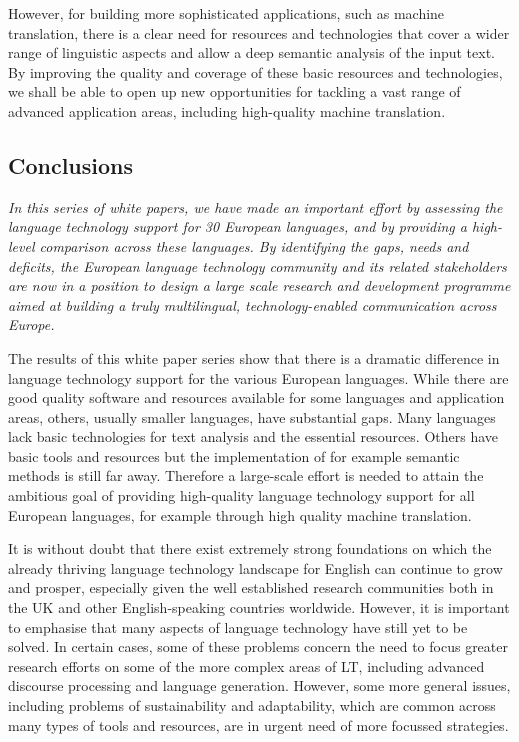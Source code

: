 \documentclass[]{../../metanetpaper}
\begin{document}
\begin{multicols}{2}
However, for building more sophisticated applications, such as machine translation, there is a clear need for resources and technologies that cover a wider range of linguistic aspects and allow a deep semantic analysis of the input text. By improving the quality and coverage of these basic resources and technologies, we shall be able to open up new opportunities for tackling a vast range of advanced application areas, including high-quality machine translation.

\subsection{Conclusions}

\emph{In this series of white papers, we have made an important effort by assessing the language technology support for 30 European languages, and by providing a high-level comparison across these languages. By identifying the gaps, needs and deficits, the European language technology community and its related stakeholders are now in a position to design a large scale research and development programme aimed at building a truly multilingual, technology-enabled communication across Europe.}

The results of this white paper series show that there is a dramatic difference in language technology support for the various European languages. While there are good quality software and resources available for some languages and application areas, others, usually smaller languages, have substantial gaps. Many languages lack basic technologies for text analysis and the essential resources. Others have basic tools and resources but the implementation of for example semantic methods is still far away. Therefore a large-scale effort is needed to attain the ambitious goal of providing high-quality language technology support for all European languages, for example through high quality machine translation. 

It is without doubt that there exist extremely strong foundations on which the already thriving language technology landscape for English can continue to grow and prosper, especially given the well established research communities both in the UK and other English-speaking countries worldwide. However, it is important to emphasise that many aspects of language technology have still yet to be solved. In certain cases, some of these problems concern the need to focus greater research efforts on some of the more complex areas of LT, including advanced discourse processing and language generation. However, some more general issues, including problems of sustainability and adaptability, which are common across many types of tools and resources, are in urgent need of more focussed strategies.


\end{multicols}
\end{document}
